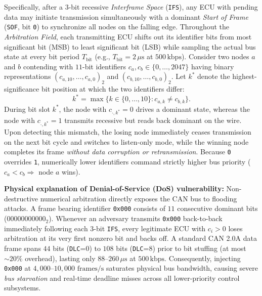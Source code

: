 \documentclass[12pt, a4paper, reqno, oneside]{book}
\DeclareRobustCommand{\code}[1]{\nolinkurl{#1}}
\begin{document}
Specifically, after a $3$-bit recessive \textit{Interframe Space} (\code{IFS}), any ECU with pending data may initiate transmission simultaneously with a dominant \textit{Start of Frame} (\code{SOF}, bit \texttt{0}) to synchronize all nodes on the falling edge. Throughout the \textit{Arbitration Field}, each transmitting ECU shifts out its identifier bits from most significant bit (MSB) to least significant bit (LSB) while sampling the actual bus state at every bit period $T_{\text{bit}}$ (e.g., $T_{\text{bit}} = 2\,\mu\text{s}$ at $500\,\text{kbps}$). Consider two nodes $a$ and $b$ contending with $11$-bit identifiers $c_a, c_b \in \{0, \ldots, 2047\}$ having binary representations $(c_{a,10}, \ldots, c_{a,0})_2$ and $(c_{b,10}, \ldots, c_{b,0})_2$. Let $k^*$ denote the highest-significance bit position at which the two identifiers differ:
\begin{equation}\label{eq:can-arbitration}
k^* = \max\big\{k \in \{0, \ldots, 10\} : c_{a,k} \neq c_{b,k}\big\}.
\end{equation}
During bit slot $k^*$, the node with $c_{\cdot, k^*} = 0$ drives a dominant state, whereas the node with $c_{\cdot, k^*} = 1$ transmits recessive but reads back dominant on the wire. Upon detecting this mismatch, the losing node immediately ceases transmission on the next bit cycle and switches to listen-only mode, while the winning node completes its frame \emph{without data corruption or retransmission}. Because \texttt{0} overrides \texttt{1}, numerically lower identifiers command strictly higher bus priority ($c_a < c_b \Rightarrow$ node $a$ wins).

\textbf{Physical explanation of Denial-of-Service (DoS) vulnerability:} Non-destructive numerical arbitration directly exposes the CAN bus to flooding attacks. A frame bearing identifier \texttt{0x000} consists of $11$ consecutive dominant bits ($00000000000_2$). Whenever an adversary transmits \texttt{0x000} back-to-back immediately following each $3$-bit \code{IFS}, every legitimate ECU with $c_i > 0$ loses arbitration at its very first nonzero bit and backs off. A standard CAN 2.0A data frame spans $44$ bits (\code{DLC}=0) to $108$ bits (\code{DLC}=8) prior to bit stuffing (at most $\sim 20\%$ overhead), lasting only $88\text{--}260\,\mu\text{s}$ at $500\,\text{kbps}$. Consequently, injecting \texttt{0x000} at $4{,}000\text{--}10{,}000\text{ frames/s}$ saturates physical bus bandwidth, causing severe \textit{bus starvation} and real-time deadline misses across all lower-priority control subsystems.
\end{document}
